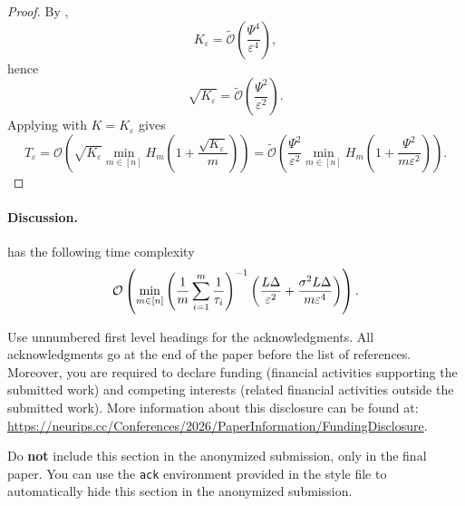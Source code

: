 \documentclass{article}
\begin{document}
% 
\begin{proof}
  By ,
  \begin{equation*}
      K_\varepsilon = \widetilde{\mathcal{O}}\left(\frac{\Psi^4}{\varepsilon^4}\right),
  \end{equation*}
  hence
  \begin{equation*}
      \sqrt{K_\varepsilon} = \widetilde{\mathcal{O}}\left(\frac{\Psi^2}{\varepsilon^2}\right).
  \end{equation*}
  Applying  with $K = K_\varepsilon$ gives
  \begin{equation*}
      T_\varepsilon
      =
      \mathcal{O}\left(
          \sqrt{K_\varepsilon}
          \min_{m \in [n]} H_m \left(1 + \frac{\sqrt{K_\varepsilon}}{m}\right)
      \right)
      =
      \widetilde{\mathcal{O}}\left(
          \frac{\Psi^2}{\varepsilon^2}
          \min_{m \in [n]} H_m \left(
              1 + \frac{\Psi^2}{m\varepsilon^2}
          \right)
      \right).
  \end{equation*}
\end{proof}
% 
% 
\paragraph{Discussion.}
% 
\ringmaster \citep{maranjyan2025ringmaster} has the following time complexity
\begin{align*}
  \mathcal{O}\left(\min\limits_{m \in [n]} \left(\frac{1}{m} \sum\limits_{i=1}^{m} \frac{1}{\tau_{i}}\right)^{-1} \left(\frac{L \Delta}{\varepsilon^2} + \frac{\sigma^2 L \Delta}{m \varepsilon^4}\right) \right) .
\end{align*}


\begin{ack}
Use unnumbered first level headings for the acknowledgments. All acknowledgments
go at the end of the paper before the list of references. Moreover, you are required to declare
funding (financial activities supporting the submitted work) and competing interests (related financial activities outside the submitted work).
More information about this disclosure can be found at: \url{https://neurips.cc/Conferences/2026/PaperInformation/FundingDisclosure}.


Do {\bf not} include this section in the anonymized submission, only in the final paper. You can use the \texttt{ack} environment provided in the style file to automatically hide this section in the anonymized submission.
\end{ack}
\end{document}
